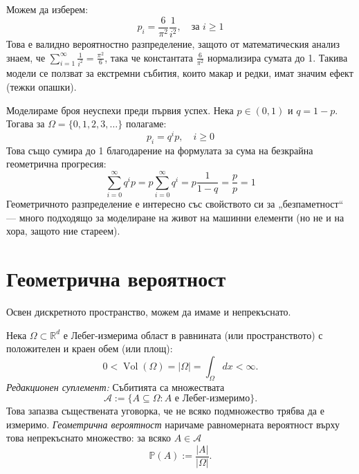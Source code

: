 \begin{example}\label{ex:02-2}
Можем да изберем:
\[ p_i = \frac{6}{\pi^2} \frac{1}{i^2}, \quad \text{за } i \ge 1 \]
Това е валидно вероятностно разпределение, защото от математическия анализ знаем, че $\sum_{i=1}^\infty \frac{1}{i^2} = \frac{\pi^2}{6}$, така че константата $\frac{6}{\pi^2}$ нормализира сумата до 1. Такива модели се ползват за екстремни събития, които макар и редки, имат значим ефект (тежки опашки).

\end{example}

\begin{example}\label{ex:02-3}
Моделираме броя неуспехи преди първия успех. Нека $p \in (0, 1)$ и $q = 1 - p$. Тогава за $\Omega = \{0, 1, 2, 3, \dots\}$ полагаме:
\[ p_i = q^i p, \quad i \ge 0 \]
Това също сумира до 1 благодарение на формулата за сума на безкрайна геометрична прогресия:
\[ \sum_{i=0}^\infty q^i p = p \sum_{i=0}^\infty q^i = p \frac{1}{1-q} = \frac{p}{p} = 1 \]
Геометричното разпределение е интересно със свойството си за „безпаметност“ — много подходящо за моделиране на живот на машинни елементи (но не и на хора, защото ние стареем).

\end{example}

\section{Геометрична вероятност}

Освен дискретното пространство, можем да имаме и непрекъснато.

\begin{defn}\label{def:geometric}
Нека $\Omega \subset \mathbb{R}^d$ е Лебег-измерима област в равнината
(или пространството) с положителен и краен обем (или площ):
\[ 0 < \operatorname{Vol}(\Omega) = |\Omega| = \int_{\Omega} dx < \infty . \]
\emph{Редакционен суплемент:} Събитията са множествата
\[ \mathcal{A} := \{A\subseteq\Omega : A\text{ е Лебег-измеримо}\}. \]
Това запазва съществената уговорка, че не всяко подмножество трябва да е
измеримо. \emph{Геометрична вероятност} наричаме равномерната вероятност
върху това непрекъснато множество: за всяко $A\in\mathcal{A}$
\[ \mathbb{P}(A) := \frac{|A|}{|\Omega|} . \]
\end{defn}

